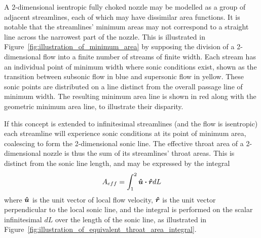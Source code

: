 \documentclass[a4paper, 11pt, oneside]{report}
\begin{document}
A 2-dimensional isentropic fully choked nozzle may be modelled as a group of adjacent streamlines, each of which may have dissimilar area functions. It is notable that the streamlines' minimum areas may not correspond to a straight line across the narrowest part of the nozzle. This is illustrated in Figure~\ref{fig:illustration_of_minimum_area} by supposing the division of a 2-dimensional flow into a finite number of streams of finite width. Each stream has an individual point of minimum width where sonic conditions exist, shown as the transition between subsonic flow in blue and supersonic flow in yellow. These sonic points are distributed on a line distinct from the overall passage line of minimum width. The resulting minimum area line is shown in red along with the geometric minimum area line, to illustrate their disparity.

If this concept is extended to infinitesimal streamlines (and the flow is isentropic) each streamline will experience sonic conditions at its point of minimum area, coalescing to form the 2-dimensional sonic line. The effective throat area of a 2-dimensional nozzle is thus the sum of its streamlines' throat areas. This is distinct from the sonic line length, and may be expressed by the integral
\begin{equation}\label{effective_throat_area_integral}
	A_{eff} = 
	\int_{1}^2 \vu*{u} \vdot \vu*{r} dL
\end{equation}
where $\vu*{u}$ is the unit vector of local flow velocity, $\vu*{r}$ is the unit vector perpendicular to the local sonic line, and the integral is performed on the scalar infinitesimal $dL$ over the length of the sonic line, as illustrated in Figure~\ref{fig:illustration_of_equivalent_throat_area_integral}.
 		
\end{document}
